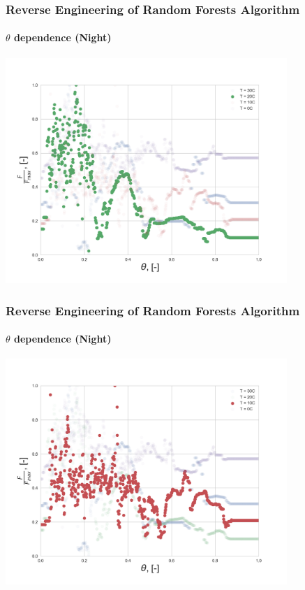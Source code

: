 \documentclass{beamer}
\begin{document}
\begin{frame}
\frametitle{Reverse Engineering of Random Forests Algorithm}
\framesubtitle{$\theta$ dependence (Night)}

\centering
\includegraphics[width=0.8\textwidth]{Theta_dependence_20.png}

\end{frame}

\begin{frame}
\frametitle{Reverse Engineering of Random Forests Algorithm}
\framesubtitle{$\theta$ dependence (Night)}

\centering
\includegraphics[width=0.8\textwidth]{Theta_dependence_10.png}

\end{frame}
\end{document}
